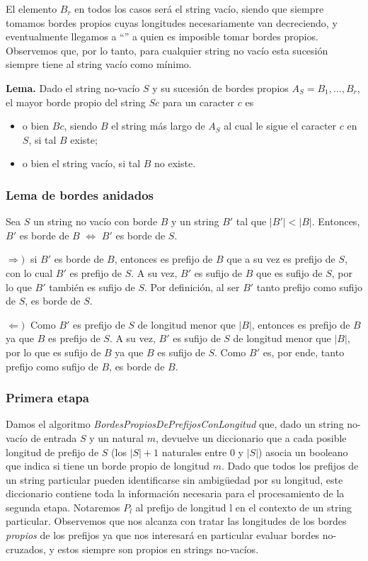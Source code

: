 El elemento $B_r$ en todos los casos será el string vacío, siendo que siempre tomamos bordes propios cuyas longitudes necesariamente van decreciendo, y eventualmente llegamos a ``'' a quien es imposible tomar bordes propios. Observemos que, por lo tanto, para cualquier string no vacío esta sucesión siempre tiene al string vacío como mínimo.

\medskip

\textbf{Lema.} Dado el string no-vacío $S$ y su sucesión de bordes propios $A_S = B_1, \dots, B_r$, el mayor borde propio del string $Sc$ para un caracter $c$ es

\begin{itemize}
\setlength\itemsep{0em}
\item o bien $Bc$, siendo $B$ el string más largo de $A_S$ al cual le sigue el caracter $c$ en $S$, si tal $B$ existe;
\item o bien el string vacío, si tal $B$ no existe.
\end{itemize}

\subsubsection{Lema de bordes anidados}

Sea $S$ un string no vacío con borde $B$ y un string $B'$ tal que $|B'| < |B|$. Entonces, $B'$ es borde de $B$ $\iff$ $B'$ es borde de $S$.

\medskip

$\Longrightarrow) \ $ si $B'$ es borde de $B$, entonces es prefijo de $B$ que a su vez es prefijo de $S$, con lo cual $B'$ es prefijo de $S$. A su vez, $B'$ es sufijo de $B$ que es sufijo de $S$, por lo que $B'$ también es sufijo de $S$. Por definición, al ser $B'$ tanto prefijo como sufijo de $S$, es borde de $S$.

$\Longleftarrow) \ $ Como $B'$ es prefijo de $S$ de longitud menor que $|B|$, entonces es prefijo de $B$ ya que $B$ es prefijo de $S$. A su vez, $B'$ es sufijo de $S$ de longitud menor que $|B|$, por lo que es sufijo de $B$ ya que $B$ es sufijo de $S$. Como $B'$ es, por ende, tanto prefijo como sufijo de $B$, es borde de $B$.

\subsubsection{Primera etapa}

Damos el algoritmo \textit{BordesPropiosDePrefijosConLongitud} que, dado un string no-vacío de entrada $S$ y un natural $m$, devuelve un diccionario que a cada posible longitud de prefijo de $S$ (los $|S|+1$ naturales entre 0 y $|S|$) asocia un booleano que indica si tiene un borde propio de longitud $m$. Dado que todos los prefijos de un string particular pueden identificarse sin ambigüedad por su longitud, este diccionario contiene toda la información necesaria para el procesamiento de la segunda etapa. Notaremos $P_l$ al prefijo de longitud l en el contexto de un string particular. Observemos que nos alcanza con tratar las longitudes de los bordes \textit{propios} de los prefijos ya que nos interesará en particular evaluar bordes no-cruzados, y estos siempre son propios en strings no-vacíos.

